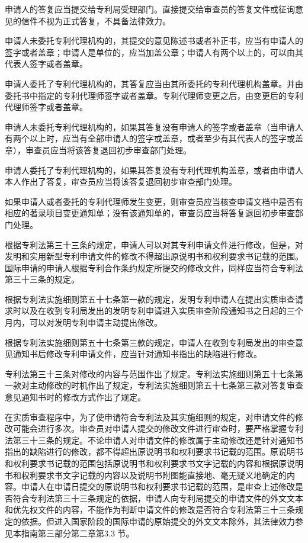 申请人的答复应当提交给专利局受理部门。直接提交给审查员的答复文件或征询意见的信件不视为正式答复，不具备法律效力。

申请人未委托专利代理机构的，其提交的意见陈述书或者补正书，应当有申请人的签字或者盖章；申请人是单位的，应当加盖公章；申请人有两个以上的，可以由其代表人签字或者盖章。

申请人委托了专利代理机构的，其答复应当由其所委托的专利代理机构盖章。并由委托书中指定的专利代理师签字或者盖章。专利代理师变更之后，由变更后的专利代理师签字或者盖章。

申请人未委托专利代理机构的，如果其答复没有申请人的签字或者盖章（当申请人有两个以上时，应当有全部申请人的签字或盖章，或者至少有其代表人的签字或盖章），审查员应当将该答复退回初步审查部门处理。

申请人委托了专利代理机构的，如果其答复没有专利代理机构盖章，或者由申请人本人作出了答复，审查员应当将该答复退回初步审查部门处理。

如果申请人或者委托的专利代理师发生变更，则审查员应当核查申请文档中是否有相应的著录项目变更通知单；没有该通知单的，审查员应当将答复退回初步审查部门处理。

根据专利法第三十三条的规定，申请人可以对其专利申请文件进行修改，但是，对发明和实用新型专利申请文件的修改不得超出原说明书和权利要求书记载的范围。国际申请的申请人根据专利合作条约规定所提交的修改文件，同样应当符合专利法第三十三条的规定。

根据专利法实施细则第五十七条第一款的规定，发明专利申请人在提出实质审查请求时以及在收到专利局发出的发明专利申请进入实质审查阶段通知书之日起的三个月内，可以对发明专利申请主动提出修改。

根据专利法实施细则第五十七条第三款的规定，申请人在收到专利局发出的审查意见通知书后修改专利申请文件，应当针对通知书指出的缺陷进行修改。

专利法第三十三条对修改的内容与范围作出了规定。专利法实施细则第五十七条第一款对主动修改的时机作出了规定，专利法实施细则第五十七条第三款对答复审查意见通知书时的修改方式作出了规定。

在实质审查程序中，为了使申请符合专利法及其实施细则的规定，对申请文件的修改可能会进行多次。审查员对申请人提交的修改文件进行审查时，要严格掌握专利法第三十三条的规定。不论申请人对申请文件的修改属于主动修改还是针对通知书指出的缺陷进行的修改，都不得超出原说明书和权利要求书记载的范围。原说明书和权利要求书记载的范围包括原说明书和权利要求书文字记载的内容和根据原说明书和权利要求书文字记载的内容以及说明书附图能直接地、毫无疑义地确定的内容。申请人在申请日提交的原说明书和权利要求书记载的范围，是审查上述修改是否符合专利法第三十三条规定的依据，申请人向专利局提交的申请文件的外文文本和优先权文件的内容，不能作为判断申请文件的修改是否符合专利法第三十三条规定的依据。但进入国家阶段的国际申请的原始提交的外文文本除外，其法律效力参见本指南第三部分第二章第3.3 节。

